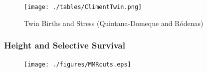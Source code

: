 \documentclass[10pt,letterpaper,subeqn]{beamer}
\begin{document}
\begin{frame}[label=USA1]

\hyperlink{c}{}
\end{frame}

\begin{frame}[label=USA2]

\hyperlink{c}{}
\end{frame}

\begin{frame}[label=Scotland]

\hyperlink{c}{}
\end{frame}

 \begin{frame}[label=Spain1]

\hyperlink{c}{}
\end{frame}

 \begin{frame}[label=Spain2]
\begin{figure}[htpb!]
\caption{Twin Births and Stress (Quintana-Domeque and R\'odenas)}
\centering
  \texttt{[image: ./tables/ClimentTwin.png]}
\end{figure}
\hyperlink{c}{}
\end{frame}

 \begin{frame}[label=Brazil]

\hyperlink{c}{}
\end{frame}

\begin{frame}[label=Sweden]

\hyperlink{c}{}
\end{frame}

\begin{frame}[label=TwinDeath]

\end{frame}

\begin{frame}

\hyperlink{c}{}
\end{frame}

\begin{frame}[label=surv]

\hyperlink{robust}{}
\end{frame}

\begin{frame}
\frametitle{Height and Selective Survival}
\begin{figure}[htpb!]
\centering
  \texttt{[image: ./figures/MMRcuts.eps]}
\end{figure}
\hyperlink{robust}{}
\end{frame}
\end{document}
